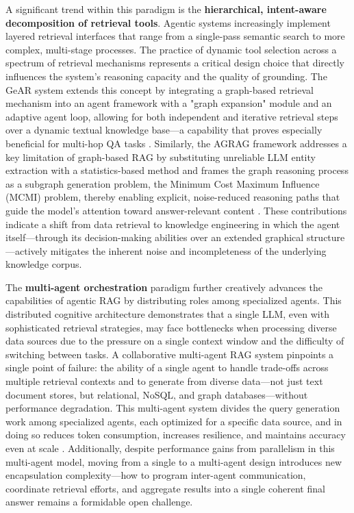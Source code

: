 \documentclass[11pt,a4paper]{article}
\begin{document}
A significant trend within this paradigm is the \textbf{hierarchical, intent-aware decomposition of retrieval tools}. Agentic systems increasingly implement layered retrieval interfaces that range from a single-pass semantic search to more complex, multi-stage processes. The practice of dynamic tool selection across a spectrum of retrieval mechanisms represents a critical design choice that directly influences the system's reasoning capacity and the quality of grounding. The GeAR system extends this concept by integrating a graph-based retrieval mechanism into an agent framework with a "graph expansion" module and an adaptive agent loop, allowing for both independent and iterative retrieval steps over a dynamic textual knowledge base---a capability that proves especially beneficial for multi-hop QA tasks \cite{arxiv:2412.18431v2}. Similarly, the AGRAG framework addresses a key limitation of graph-based RAG by substituting unreliable LLM entity extraction with a statistics-based method and frames the graph reasoning process as a subgraph generation problem, the Minimum Cost Maximum Influence (MCMI) problem, thereby enabling explicit, noise-reduced reasoning paths that guide the model's attention toward answer-relevant content \cite{arxiv:2511.05549v2}. These contributions indicate a shift from data retrieval to knowledge engineering in which the agent itself---through its decision-making abilities over an extended graphical structure---actively mitigates the inherent noise and incompleteness of the underlying knowledge corpus.

The \textbf{multi-agent orchestration} paradigm further creatively advances the capabilities of agentic RAG by distributing roles among specialized agents. This distributed cognitive architecture demonstrates that a single LLM, even with sophisticated retrieval strategies, may face bottlenecks when processing diverse data sources due to the pressure on a single context window and the difficulty of switching between tasks. A collaborative multi-agent RAG system pinpoints a single point of failure: the ability of a single agent to handle trade-offs across multiple retrieval contexts and to generate from diverse data---not just text document stores, but relational, NoSQL, and graph databases---without performance degradation. This multi-agent system divides the query generation work among specialized agents, each optimized for a specific data source, and in doing so reduces token consumption, increases resilience, and maintains accuracy even at scale \cite{arxiv:2412.05838v1}. Additionally, despite performance gains from parallelism in this multi-agent model, moving from a single to a multi-agent design introduces new encapsulation complexity---how to program inter-agent communication, coordinate retrieval efforts, and aggregate results into a single coherent final answer remains a formidable open challenge.
\end{document}
